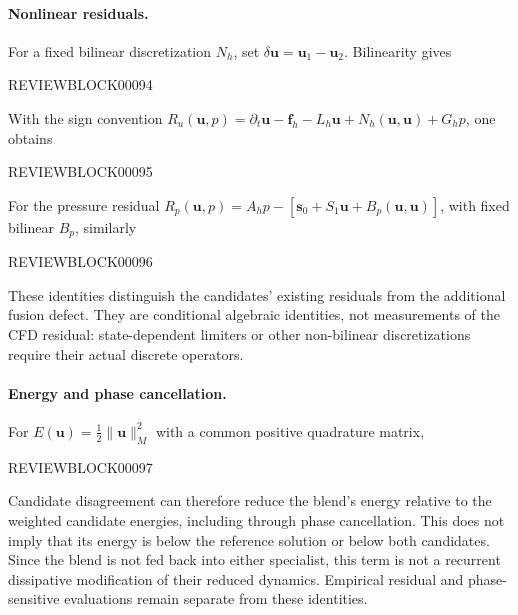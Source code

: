 \documentclass{article}
\begin{document}
\paragraph{Nonlinear residuals.}
For a fixed bilinear discretization $N_h$, set $\delta\bm u=\bm u_1-\bm u_2$. Bilinearity gives


REVIEWBLOCK00094


With the sign convention
$R_u(\bm u,p)=\partial_t\bm u-\bm f_h-L_h\bm u+N_h(\bm u,\bm u)+G_hp$, one obtains


REVIEWBLOCK00095


For the pressure residual
$R_p(\bm u,p)=A_hp-[\bm s_0+S_1\bm u+B_p(\bm u,\bm u)]$, with fixed bilinear $B_p$, similarly


REVIEWBLOCK00096


These identities distinguish the candidates' existing residuals from the additional fusion defect. They are conditional algebraic identities, not measurements of the CFD residual: state-dependent limiters or other non-bilinear discretizations require their actual discrete operators.

\paragraph{Energy and phase cancellation.}
For $E(\bm u)=\tfrac12\|\bm u\|_M^2$ with a common positive quadrature matrix,


REVIEWBLOCK00097


Candidate disagreement can therefore reduce the blend's energy relative to the weighted candidate energies, including through phase cancellation. This does not imply that its energy is below the reference solution or below both candidates. Since the blend is not fed back into either specialist, this term is not a recurrent dissipative modification of their reduced dynamics. Empirical residual and phase-sensitive evaluations remain separate from these identities.
\end{document}
